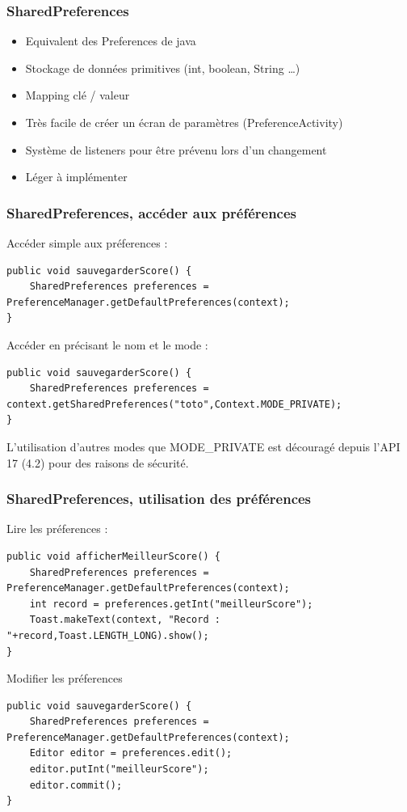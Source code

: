 \documentclass{beamer}
\begin{document}
\begin{frame}
\frametitle{SharedPreferences}
\begin{itemize}
    \item Equivalent des Preferences de java
    \item Stockage de données primitives (int, boolean, String \ldots)
    \item Mapping clé / valeur
    \item Très facile de créer un écran de paramètres (PreferenceActivity)
    \item Système de listeners pour être prévenu lors d'un changement
    \item Léger à implémenter
\end{itemize}
\end{frame}
\begin{frame}[fragile]
\frametitle{SharedPreferences, accéder aux préférences}
Accéder simple aux préferences :\\
\begin{lstlisting}
public void sauvegarderScore() {
    SharedPreferences preferences = PreferenceManager.getDefaultPreferences(context);
}
\end{lstlisting}
Accéder en précisant le nom et le mode :\\
\begin{lstlisting}
public void sauvegarderScore() {
    SharedPreferences preferences = context.getSharedPreferences("toto",Context.MODE_PRIVATE);
}
\end{lstlisting}
L'utilisation d'autres modes que MODE\_PRIVATE est découragé depuis l'API 17 (4.2) pour des raisons de sécurité.\\
\end{frame}
\begin{frame}[fragile]
\frametitle{SharedPreferences, utilisation des préférences}
Lire les préferences :\\
\begin{lstlisting}
public void afficherMeilleurScore() {
    SharedPreferences preferences = PreferenceManager.getDefaultPreferences(context);
    int record = preferences.getInt("meilleurScore");
    Toast.makeText(context, "Record : "+record,Toast.LENGTH_LONG).show();
}
\end{lstlisting}
Modifier les préferences\\
\begin{lstlisting}
public void sauvegarderScore() {
    SharedPreferences preferences = PreferenceManager.getDefaultPreferences(context);
    Editor editor = preferences.edit();
    editor.putInt("meilleurScore");
    editor.commit();
}
\end{lstlisting}
\end{frame}
\end{document}
